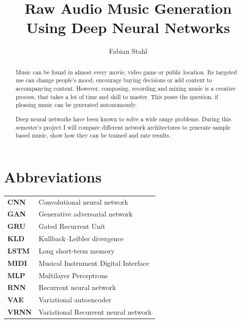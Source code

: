 \documentclass[12pt]{article}
\begin{document}
\setlength\parindent{0pt}
\title{Raw Audio Music Generation Using Deep Neural Networks}
\author{Fabian Stahl}


\maketitle

\tableofcontents

\newpage
\section*{Abbreviations}
\begin{center}
\begin{tabular}{l l}
\textbf{CNN} & Convolutional neural network \\
\textbf{GAN} & Generative adversarial network \\
\textbf{GRU} & Gated Recurrent Unit \\
\textbf{KLD}  & Kullback–Leibler divergence\\
\textbf{LSTM} & Long short-term memory \\
\textbf{MIDI} & Musical Instrument Digital Interface \\
\textbf{MLP} & Multilayer Perceptrons \\
\textbf{RNN} & Recurrent neural network \\
\textbf{VAE} & Variational autoencoder \\
\textbf{VRNN} & Variational Recurrent neural network \\
\end{tabular}
\end{center}
\newpage


\begin{abstract}
Music can be found in almost every movie, video game or public location.
Its targeted use can change people's mood, encourage buying decisions or add context to accompanying content.
However, composing, recording and mixing music is a creative process, that takes a lot of time and skill to master.
This poses the question, if pleasing music can be generated autonomously.

Deep neural networks have been known to solve a wide range problems.
During this semester's project I will compare different network architectures to generate sample based music, show how they can be trained and rate results.
\end{abstract}
\end{document}
